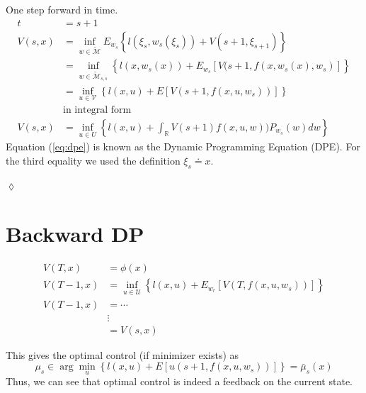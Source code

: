 \begin{example}
One step forward in time.
\begin{align}
\label{eq:dpe}
t &= s+1 \nonumber \\
V(s,x) &= \inf_{w\in\tilde{\mathcal{M}}} E_{w_s}\left\lbrace l(\xi_s,w_s(\xi_s)) + V(s+1,\xi_{s+1})\right\rbrace \nonumber \\
&= \inf_{w\in\tilde{\mathcal{M}}_{s,s}} \left\lbrace l(x,w_s(x)) + E_{w_s}[V(s+1,f(x,w_s(x),w_s)]\right\rbrace \nonumber \\
&= \inf_{u\in\mathcal{V}} \left\lbrace l(x,u) + E[V(s+1,f(x,u,w_s))]\right\rbrace \nonumber \\
&\text{in integral form} \nonumber \\
V(s,x) &= \inf_{u\in U} \left\lbrace l(x,u) + \int_{\mathbb{R}}V(s+1)f(x,u,w))P_{w_s}(w)dw\right\rbrace
\end{align}
Equation (\ref{eq:dpe}) is known as the Dynamic Programming Equation (DPE). For the third equality we used the definition $\xi_s \doteq x$.
\end{example}
$\lozenge$

\section{Backward DP}
\begin{align*}
V(T,x) &= \phi(x) \\
V(T-1,x) &= \inf_{u\in\mathcal{U}} \left\lbrace l(x,u) + E_{w_r}[V(T,f(x,u,w_s))]\right\rbrace \\
V(T-1,x) &= \cdots \\
&\vdots \\
&= V(s,x)
\end{align*}

This gives the optimal control (if minimizer exists) as
$$\mu_s \in \arg\min_{u} \left\lbrace l(x,u) + E[u(s+1,f(x,u,w_s))]\right\rbrace = \bar{\mu}_s(x)$$
Thus, we can see that optimal control is indeed a feedback on the current state.


% 

